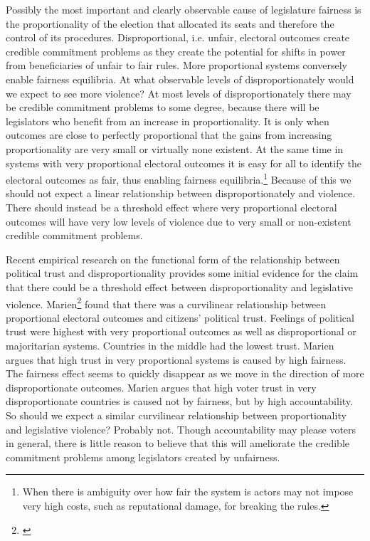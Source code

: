 \documentclass[a4paper]{article}\usepackage[]{graphicx}\usepackage[]{color}
\begin{document}
Possibly the most important and clearly observable cause of legislature fairness is the proportionality of the election that allocated its seats and therefore the control of its procedures. Disproportional, i.e. unfair, electoral outcomes create credible commitment problems as they create the potential for shifts in power from beneficiaries of unfair to fair rules. More proportional systems conversely enable fairness equilibria. At what observable levels of disproportionately would we expect to see more violence? At most levels of disproportionately there may be credible commitment problems to some degree, because there will be legislators who benefit from an increase in proportionality. It is only when outcomes are close to perfectly proportional that the gains from increasing proportionality are very small or virtually none existent. At the same time in systems with very proportional electoral outcomes it is easy for all to identify the electoral outcomes as fair, thus enabling fairness equilibria.\footnote{When there is ambiguity over how fair the system is actors may not impose very high costs, such as reputational damage, for breaking the rules.} Because of this we should not expect a linear relationship between disproportionately and violence. There should instead be a threshold effect where very proportional electoral outcomes will have very low levels of violence due to very small or non-existent credible commitment problems. 

Recent empirical research on the functional form of the relationship between political trust and disproportionality provides some initial evidence for the claim that there could be a threshold effect between disproportionality and legislative violence. Marien\footnote{\citealt{Marien2011}} found that there was a curvilinear relationship between proportional electoral outcomes and citizens' political trust. Feelings of political trust were highest with very proportional outcomes as well as disproportional or majoritarian systems. Countries in the middle had the lowest trust. Marien argues that high trust in very proportional systems is caused by high fairness. The fairness effect seems to quickly disappear as we move in the direction of more disproportionate outcomes. Marien argues that high voter trust in very disproportionate countries is caused not by fairness, but by high accountability. So should we expect a similar curvilinear relationship between proportionality and legislative violence? Probably not. Though accountability may please voters in general, there is little reason to believe that this will ameliorate the credible commitment problems among legislators created by unfairness.
\end{document}
